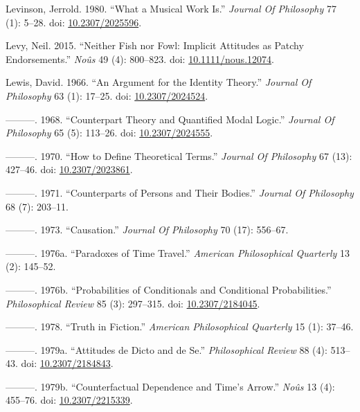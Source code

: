 \documentclass[
  10pt,
  letterpaper,
  DIV=11,
  numbers=noendperiod,
  twoside]{scrartcl}
\newlength{\cslhangindent}
\newenvironment{CSLReferences}[2] %
 {\begin{list}{}{%
  \setlength{\itemindent}{0pt}
  \setlength{\leftmargin}{0pt}
  \setlength{\parsep}{0pt}
  \ifodd #1
   \setlength{\leftmargin}{\cslhangindent}
   \setlength{\itemindent}{-1\cslhangindent}
  \fi
  \setlength{\itemsep}{#2\baselineskip}}}
 {\end{list}}
\begin{document}
\begin{CSLReferences}{1}{0}
Levinson, Jerrold. 1980. {``What a Musical Work Is.''} \emph{Journal Of
Philosophy} 77 (1): 5--28. doi:
\href{https://doi.org/10.2307/2025596}{10.2307/2025596}.

Levy, Neil. 2015. {``Neither Fish nor Fowl: Implicit Attitudes as Patchy
Endorsements.''} \emph{Noûs} 49 (4): 800--823. doi:
\href{https://doi.org/10.1111/nous.12074}{10.1111/nous.12074}.

Lewis, David. 1966. {``An Argument for the Identity Theory.''}
\emph{Journal Of Philosophy} 63 (1): 17--25. doi:
\href{https://doi.org/10.2307/2024524}{10.2307/2024524}.

---------. 1968. {``Counterpart Theory and Quantified Modal Logic.''}
\emph{Journal Of Philosophy} 65 (5): 113--26. doi:
\href{https://doi.org/10.2307/2024555}{10.2307/2024555}.

---------. 1970. {``How to Define Theoretical Terms.''} \emph{Journal Of
Philosophy} 67 (13): 427--46. doi:
\href{https://doi.org/10.2307/2023861}{10.2307/2023861}.

---------. 1971. {``Counterparts of Persons and Their Bodies.''}
\emph{Journal Of Philosophy} 68 (7): 203--11.

---------. 1973. {``Causation.''} \emph{Journal Of Philosophy} 70 (17):
556--67.

---------. 1976a. {``Paradoxes of Time Travel.''} \emph{American
Philosophical Quarterly} 13 (2): 145--52.

---------. 1976b. {``Probabilities of Conditionals and Conditional
Probabilities.''} \emph{Philosophical Review} 85 (3): 297--315. doi:
\href{https://doi.org/10.2307/2184045}{10.2307/2184045}.

---------. 1978. {``Truth in Fiction.''} \emph{American Philosophical
Quarterly} 15 (1): 37--46.

---------. 1979a. {``Attitudes de Dicto and de Se.''}
\emph{Philosophical Review} 88 (4): 513--43. doi:
\href{https://doi.org/10.2307/2184843}{10.2307/2184843}.

---------. 1979b. {``Counterfactual Dependence and Time's Arrow.''}
\emph{Noûs} 13 (4): 455--76. doi:
\href{https://doi.org/10.2307/2215339}{10.2307/2215339}.


\end{CSLReferences}
\end{document}
